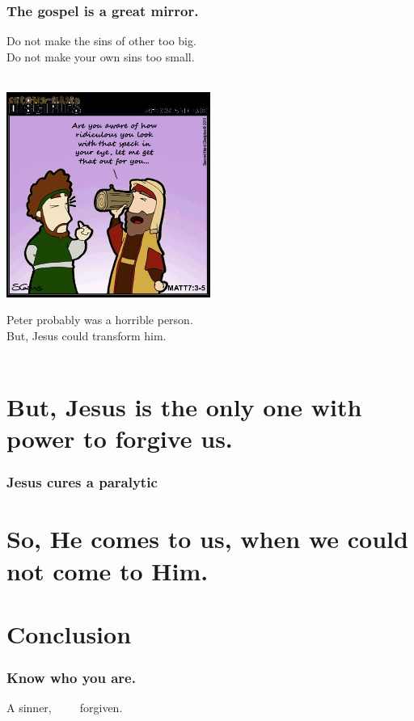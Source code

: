 \documentclass{beamer}
\begin{document}
\begin{frame}
\frametitle{The gospel is a great mirror.}
Do not make the sins of other too big.\\
Do not make your own sins too small.\\~\\
\begin{center}
\includegraphics[width=0.5\textwidth]{graphics/beam.jpg}\\
\end{center}
Peter probably was a horrible person.\\
But, Jesus could transform him.\\~\\

\end{frame}

\section{But, Jesus is the only one with power to forgive us.}
\begin{frame}
\frametitle{Jesus cures a paralytic}
\end{frame}

\section{So, He comes to us, when we could not come to Him.}
\begin{frame}
\frametitle{}
\end{frame}

\section*{Conclusion}
\begin{frame}
\frametitle{Know who you are.}
A sinner,~~~~~forgiven.
\end{frame}
\end{document}
